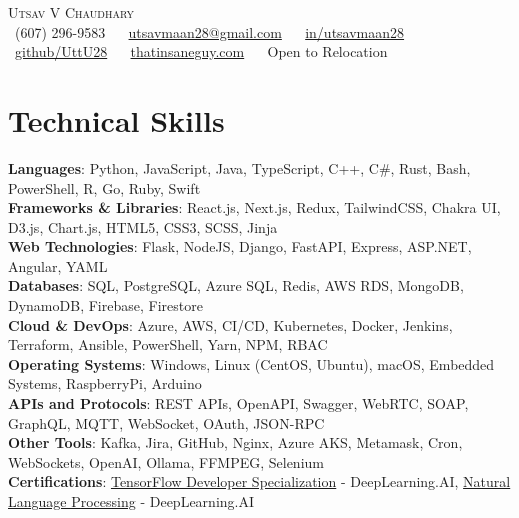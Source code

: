 \documentclass[letterpaper,8pt]{article}
\begin{document}

\begin{center}
    {\huge \scshape Utsav V Chaudhary} \\[2mm]
    \small \raisebox{-0.1\height}
    \faPhone\ (607) 296-9583 ~ 
    {\faEnvelope\  \href{mailto:utsavmaan28@gmail.com}{utsavmaan28@gmail.com}} ~ 
    {\faLinkedin\ \href{https://www.linkedin.com/in/utsavmaan28/}{in/utsavmaan28}}  ~
    {\faGithub\ \href{https://github.com/UttU28}{github/UttU28}} ~
    {\faBriefcase\ \href{https://thatinsaneguy.com/}{thatinsaneguy.com}} ~
    {\faGlobe\ {Open to Relocation}}
    \vspace{-5pt}
\end{center}

\section{Technical Skills}
  \begin{itemize}[leftmargin=0.0in, label={}]
    \small{\item{   
    \textbf{Languages}{: Python, JavaScript, Java, TypeScript, C++, C\#, Rust, Bash, PowerShell, R, Go, Ruby, Swift} \\[1mm]
    \textbf{Frameworks \& Libraries}{: React.js, Next.js, Redux, TailwindCSS, Chakra UI, D3.js, Chart.js, HTML5, CSS3, SCSS, Jinja} \\[1mm]
    \textbf{Web Technologies}{: Flask, NodeJS, Django, FastAPI, Express, ASP.NET, Angular, YAML} \\[1mm]
    \textbf{Databases}{: SQL, PostgreSQL, Azure SQL, Redis, AWS RDS, MongoDB, DynamoDB, Firebase, Firestore} \\[1mm]
    \textbf{Cloud \& DevOps}{: Azure, AWS, CI/CD, Kubernetes, Docker, Jenkins, Terraform, Ansible, PowerShell, Yarn, NPM, RBAC} \\[1mm]
    \textbf{Operating Systems}{: Windows, Linux (CentOS, Ubuntu), macOS, Embedded Systems, RaspberryPi, Arduino} \\[1mm]
    \textbf{APIs and Protocols}{: REST APIs, OpenAPI, Swagger, WebRTC, SOAP, GraphQL, MQTT, WebSocket, OAuth, JSON-RPC} \\[1mm]
    \textbf{Other Tools}{: Kafka, Jira, GitHub, Nginx, Azure AKS, Metamask, Cron, WebSockets, OpenAI, Ollama, FFMPEG, Selenium} \\[1mm]
    \textbf{Certifications}{: \href{https://www.coursera.org/account/accomplishments/specialization/certificate/YW8U4922JT6N}{TensorFlow Developer Specialization} - DeepLearning.AI, \href{https://www.coursera.org/account/accomplishments/certificate/PXWY38Y7VJZB}{Natural Language Processing} - DeepLearning.AI } \\ [1mm]
    }}
  \end{itemize}
\vspace{-13pt}
\end{document}
